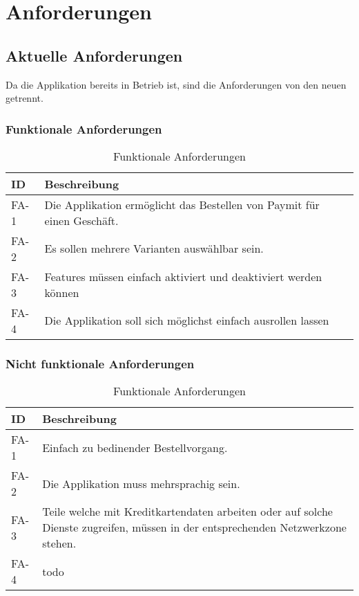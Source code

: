 \chapter{Anforderungen}

\section{Aktuelle Anforderungen}

Da die Applikation bereits in Betrieb ist, sind die Anforderungen von den neuen getrennt.

\subsection{Funktionale Anforderungen}

\begin{table}[H]
	\centering
	\caption{Funktionale Anforderungen}
	\begin{tabular}{ | p{2cm} | p{14cm} | }
		\toprule
		{\textbf{ID}} & {\textbf{Beschreibung}} \\
		\midrule
		FA-1 & Die Applikation ermöglicht das Bestellen von Paymit für einen Geschäft.  \\ \hline
		FA-2 & Es sollen mehrere Varianten auswählbar sein. \\ \hline
		FA-3 & Features müssen einfach aktiviert und deaktiviert werden können \\ \hline
		FA-4 & Die Applikation soll sich möglichst einfach ausrollen lassen \\
		\bottomrule
	\end{tabular}
\end{table}
	
\subsection{Nicht funktionale Anforderungen}

\begin{table}[H]
	\centering
	\caption{Funktionale Anforderungen}
	\begin{tabular}{ | p{2cm} | p{14cm} | }
		\toprule
		{\textbf{ID}} & {\textbf{Beschreibung}} \\
		\midrule
		FA-1 & Einfach zu bedinender Bestellvorgang. \\ \hline
		FA-2 & Die Applikation muss mehrsprachig sein. \\ \hline
		FA-3 & Teile welche mit Kreditkartendaten arbeiten oder auf solche Dienste zugreifen, müssen in der entsprechenden Netzwerkzone stehen. \\ \hline
		FA-4 & todo \\
		\bottomrule
	\end{tabular}
\end{table}


